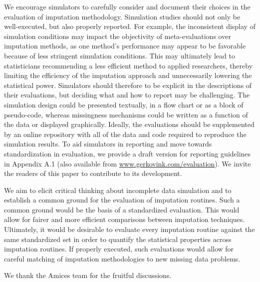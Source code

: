 \documentclass[bimj,fleqn]{w-art}
\begin{document}
We encourage simulators to carefully consider and document their choices in the evaluation of imputation methodology. Simulation studies should not only be well-executed, but also properly reported. For example, the inconsistent display of simulation conditions may impact the objectivity of meta-evaluations over imputation methods, as one method's performance may appear to be favorable because of less stringent simulation conditions. This may ultimately lead to statisticians recommending a less efficient method to applied researchers, thereby limiting the efficiency of the imputation approach and unnecessarily lowering the statistical power. Simulators should therefore to be explicit in the descriptions of their evaluations, but deciding what and how to report may be challenging. The simulation design could be presented textually, in a flow chart or as a block of pseudo-code, whereas missingness mechanisms could be written as a function of the data or displayed graphically. Ideally, the evaluations should be supplemented by an online repository with all of the data and code required to reproduce the simulation results. To aid simulators in reporting and move towards standardization in evaluation, we provide a draft version for reporting guidelines in Appendix A.1 (also available from \underline{www.gerkovink.com/evaluation}). We invite the readers of this paper to contribute to its development. 

We aim to elicit critical thinking about incomplete data simulation and to establish a common ground for the evaluation of imputation routines. Such a common ground would be the basis of a standardized evaluation. This would allow for fairer and more efficient comparisons between imputation techniques. Ultimately, it would be desirable to evaluate every imputation routine against the same standardized set in order to quantify the statistical properties across imputation routines. If properly executed, such evaluations would allow for careful matching of imputation methodologies to new missing data problems. 



\begin{acknowledgement}
We thank the Amices team for the fruitful discussions.
\end{acknowledgement}
\vspace*{1pc}


\end{document}
